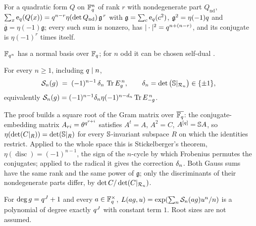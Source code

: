 \begin{lemma}
\label{lem:gauss-quadratic-form}
For a quadratic form $Q$ on $\mathbb F_q^n$ of rank $r$ with nondegenerate part $Q_{\mathrm{nd}}$,
$\sum_x\mathrm e_q(Q(x)) = q^{n-r}\eta(\det Q_{\mathrm{nd}})\,\mathfrak g^{\,r}$ with $\mathfrak g
= \sum_c\mathrm e_q(c^2)$, $\mathfrak g^2 = \eta(-1)q$ and $\overline{\mathfrak g} = \eta(-1)\mathfrak g$;
every such sum is nonzero, has $|\cdot|^2 = q^{n+(n-r)}$, and its conjugate is
$\eta(-1)^r$ times itself.
\end{lemma}

\begin{assumption}
\label{asm:normal-basis}
$\mathbb F_{q^{n}}$ has a normal basis over $\mathbb F_q$; for $n$ odd it can be chosen self-dual
\cite{lidl1997finite,lempel1988selfdual}.
\end{assumption}

\begin{theorem}
\label{thm:as-sign-law}
For every $n\ge1$, including $q\mid n$,
\[
  \mathcal S_{n}(g) \;=\; (-1)^{n-1}\,\delta_{n}\,\operatorname{Tr}E_g^{\,n},
  \qquad
  \delta_{n} = \det\big(\mathbb S|_{\mathcal R_{n}}\big)\in\{\pm1\},
\]
equivalently $\mathcal S_{n}(g) = (-1)^{n-1}\delta_{n}\eta(-1)^{n-d_{n}}\operatorname{Tr}E_{-g}^{\,n}$.
\end{theorem}

The proof builds a square root of the Gram matrix over $\overline{\mathbb F_q}$: the
conjugate-embedding matrix $A_{ri} = \theta^{q^{r+i}}$ satisfies $A^t = A$, $A^2 = C$,
$A^{[q]} = \mathbb S A$, so $\eta(\det(C|_R)) = \det(\mathbb S|_R)$ for every
$\mathbb S$-invariant subspace $R$ on which the identities restrict. Applied to the whole
space this is Stickelberger's theorem, $\eta(\operatorname{disc}) = (-1)^{n-1}$, the sign
of the $n$-cycle by which Frobenius permutes the conjugates; applied to the radical it
gives the correction $\delta_{n}$. Both Gauss sums have the same rank and the same power
of $\mathfrak g$; only the discriminants of their nondegenerate parts differ, by
$\det C/\det(C|_{\mathcal R_{n}})$.

\begin{assumption}
\label{asm:as-lpolynomial}
For $\deg g = q^{J}+1$ and every $a\in\mathbb F_q^\times$, $L(ag,u) =
\exp(\sum_n\mathcal S_{n}(ag)u^n/n)$ is a polynomial of degree exactly $q^{J}$ with
constant term $1$. Root sizes are not assumed.
\end{assumption}

